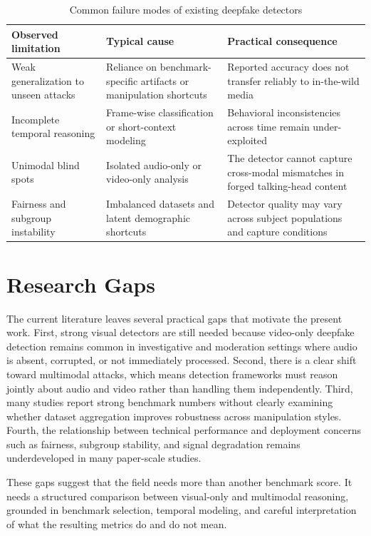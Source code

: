 \begin{table}[H]
\centering
\small
\caption{Common failure modes of existing deepfake detectors}
\label{tab:intro-limitations}
\begin{tabular}{p{}p{}p{}}
\toprule
\textbf{Observed limitation} & \textbf{Typical cause} & \textbf{Practical consequence} \\
\midrule
Weak generalization to unseen attacks & Reliance on benchmark-specific artifacts or manipulation shortcuts & Reported accuracy does not transfer reliably to in-the-wild media \\
Incomplete temporal reasoning & Frame-wise classification or short-context modeling & Behavioral inconsistencies across time remain under-exploited \\
Unimodal blind spots & Isolated audio-only or video-only analysis & The detector cannot capture cross-modal mismatches in forged talking-head content \\
Fairness and subgroup instability & Imbalanced datasets and latent demographic shortcuts & Detector quality may vary across subject populations and capture conditions \\
\bottomrule
\end{tabular}
\end{table}

\section{Research Gaps}

The current literature leaves several practical gaps that motivate the present work. First, strong visual detectors are still needed because video-only deepfake detection remains common in investigative and moderation settings where audio is absent, corrupted, or not immediately processed. Second, there is a clear shift toward multimodal attacks, which means detection frameworks must reason jointly about audio and video rather than handling them independently. Third, many studies report strong benchmark numbers without clearly examining whether dataset aggregation improves robustness across manipulation styles. Fourth, the relationship between technical performance and deployment concerns such as fairness, subgroup stability, and signal degradation remains underdeveloped in many paper-scale studies.

These gaps suggest that the field needs more than another benchmark score. It needs a structured comparison between visual-only and multimodal reasoning, grounded in benchmark selection, temporal modeling, and careful interpretation of what the resulting metrics do and do not mean.

